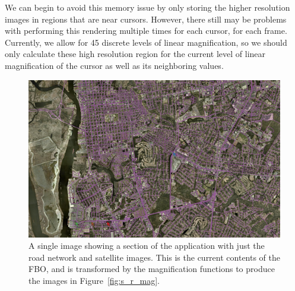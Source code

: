 We can begin to avoid this memory issue by only storing the higher resolution images in regions that are near cursors. However, there still may be problems with performing this rendering multiple times for each cursor, for each frame. Currently, we allow for 45 discrete levels of linear magnification, so we should only calculate these high resolution region for the current level of linear magnification of the cursor  as well as its neighboring values. 

\begin{figure}[htp] \centering
    \includegraphics[width=1.0\linewidth]{img/s_r_no_zoom.jpg}
    \caption[Satellite Images and Road Network without Magnification]{A single image showing a section of the application with just the road network and satellite images. This is the current contents of the FBO, and is transformed by the magnification functions to produce the images in Figure~\ref{fig:s_r_mag}.}
    \label{fig:s_r_no_zoom}
\end{figure}

